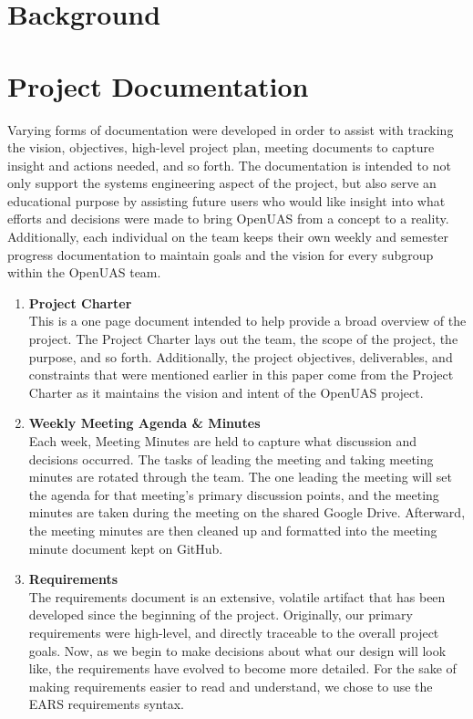\documentclass{article}
\begin{document}
\section{Background}



\section{Project Documentation}

Varying forms of documentation were developed in order to assist with tracking the vision, objectives, high-level project plan, meeting documents to capture insight and actions needed, and so forth. The documentation is intended to not only support the systems engineering aspect of the project, but also serve an educational purpose by assisting future users who would like insight into what efforts and decisions were made to bring OpenUAS from a concept to a reality. Additionally, each individual on the team keeps their own weekly and semester progress documentation to maintain goals and the vision for every subgroup within the OpenUAS team. 

\begin{enumerate}
\item \textbf{Project Charter}\\ This is a one page document intended to help provide a broad overview of the project. The Project Charter lays out the team, the scope of the project, the purpose, and so forth. Additionally, the project objectives, deliverables, and constraints that were mentioned earlier in this paper come from the Project Charter as it maintains the vision and intent of the OpenUAS project.
\item \textbf{Weekly Meeting Agenda \& Minutes}\\Each week, Meeting Minutes are held to capture what discussion and decisions occurred. The tasks of leading the meeting and taking meeting minutes are rotated through the team. The one leading the meeting will set the agenda for that meeting's primary discussion points, and the meeting minutes are taken during the meeting on the shared Google Drive. Afterward, the meeting minutes are then cleaned up and formatted into the meeting minute document kept on GitHub.
\item \textbf{Requirements}\\ The requirements document is an extensive, volatile artifact that has been developed since the beginning of the project. Originally, our primary requirements were high-level, and directly traceable to the overall project goals. Now, as we begin to make decisions about what our design will look like, the requirements have evolved to become more detailed. For the sake of making requirements easier to read and understand, we chose to use the EARS \cite{Terzakis2013} requirements syntax.
\end{enumerate}
\end{document}
